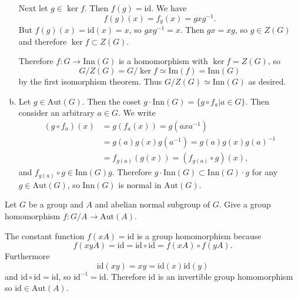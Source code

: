 \documentclass{article}
\newcounter{Problem}
\newenvironment{Problem}{\begin{Exercise}[name={Problem},
                                          counter={Problem}]}
                        {\end{Exercise}}
\begin{document}
\begin{Answer}
\begin{enumerate}[(a)]
{            Next let $g \in \ker f$. Then $f(g) = \mathrm{id}$. We have
            $$
            f(g)(x) = f_g(x) = g x g^{-1}.
            $$
            But $f(g)(x) = \mathrm{id}(x) = x$, so $g x g^{-1} =
            x$. Then $g x = x g$, so $g \in Z(G)$
            and therefore $\ker f \subset Z(G)$.

            Therefore $f: G \to \mathrm{Inn}(G)$ is a homomorphism
            with $\ker f = Z(G)$, so
            $$
            G / Z(G) = G / \ker f \simeq \mathrm{Im}(f) = \mathrm{Inn}(G)
            $$
            by the first isomorphism theorem.
            Thus $G / Z(G) \simeq \mathrm{Inn}(G)$ as desired.
           }
      \item{
        Let $g \in \mathrm{Aut}(G)$. Then the coset
        $g \cdot \mathrm{Inn}(G) = \{ g \circ f_a | a \in G \}$.
        Then consider an arbitrary $a \in G$. We write
        \begin{align*}
          (g \circ f_a)(x) 
            &= g(f_a(x)) = g(a x a^{-1}) \\
            &= g(a) g(x) g(a^{-1})
             = g(a) g(x) g(a)^{-1} \\
            &= f_{g(a)}(g(x))
             = (f_{g(a)} \circ g)(x),
        \end{align*}
        and $f_{g(a)} \circ g \in \mathrm{Inn}(G) g$. Therefore
        $g \cdot \mathrm{Inn}(G) \subset \mathrm{Inn}(G) \cdot g$ for any
        $g \in \mathrm{Aut}(G)$, so $\mathrm{Inn}(G)$ is normal
        in $\mathrm{Aut}(G)$.
      }
\end{enumerate}
\end{Answer}

\pagebreak

\begin{Problem}
Let $G$ be a group and $A$ and abelian normal subgroup of $G$. Give a
group homomorphism $f : G/A \to \mathrm{Aut}(A)$.
\end{Problem}

\begin{Answer}
The constant function $f(xA) = \mathrm{id}$ is a group homomorphism
because
$$
f(xyA) = \mathrm{id}
       = \mathrm{id} \circ \mathrm{id}
       = f(xA) \circ f(yA).
$$
Furthermore 
$$
\mathrm{id}(x y) = x y = \mathrm{id}(x) \mathrm{id}(y)
$$
and $\mathrm{id} \circ \mathrm{id} = \mathrm{id}$, so
$\mathrm{id}^{-1} = \mathrm{id}$. Therefore $\mathrm{id}$ is an
invertible group homomorphism so $\mathrm{id} \in \mathrm{Aut}(A)$.
\end{Answer}
\end{document}
